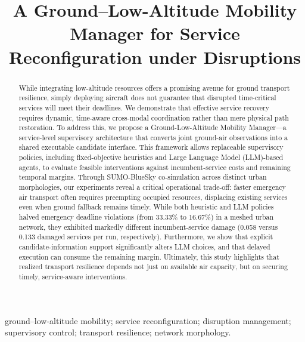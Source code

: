 \documentclass[]{interact}
\theoremstyle{plain}
\theoremstyle{definition}
\theoremstyle{remark}
\begin{document}
\title{A Ground--Low-Altitude Mobility Manager for Service Reconfiguration under Disruptions}

\author{
}

\maketitle

\begin{abstract}
While integrating low-altitude resources offers a promising avenue for ground transport resilience, simply deploying aircraft does not guarantee that disrupted time-critical services will meet their deadlines. We demonstrate that effective service recovery requires dynamic, time-aware cross-modal coordination rather than mere physical path restoration. To address this, we propose a Ground-Low-Altitude Mobility Manager—a service-level supervisory architecture that converts joint ground-air observations into a shared executable candidate interface. This framework allows replaceable supervisory policies, including fixed-objective heuristics and Large Language Model (LLM)-based agents, to evaluate feasible interventions against incumbent-service costs and remaining temporal margins. Through SUMO-BlueSky co-simulation across distinct urban morphologies, our experiments reveal a critical operational trade-off: faster emergency air transport often requires preempting occupied resources, displacing existing services even when ground fallback remains timely. While both heuristic and LLM policies halved emergency deadline violations (from 33.33\% to 16.67\%) in a meshed urban network, they exhibited markedly different incumbent-service damage (0.058 versus 0.133 damaged services per run, respectively). Furthermore, we show that explicit candidate-information support significantly alters LLM choices, and that delayed execution can consume the remaining margin. Ultimately, this study highlights that realized transport resilience depends not just on available air capacity, but on securing timely, service-aware interventions.
\end{abstract}

\begin{keywords}
ground--low-altitude mobility; service reconfiguration; disruption management; supervisory control; transport resilience; network morphology.
\end{keywords}
\end{document}
